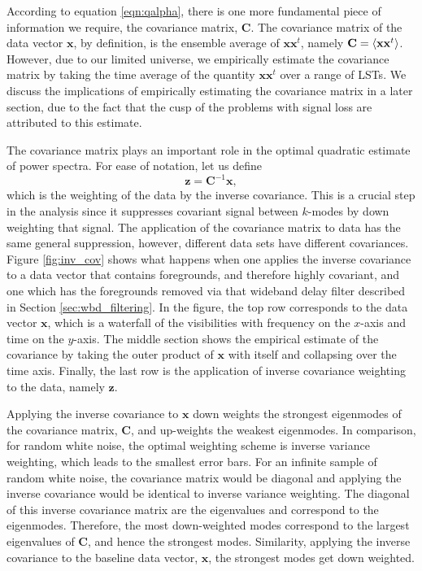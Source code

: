 \documentclass[twocolumn,numberedappendix]{emulateapj} \shorttitle{PSA64}
\newcommand{\x}{\mathbf{x}} \newcommand{\xhat}{\hat{\mathbf{x}}}
\newcommand{\C}{\mathbf{C}} \newcommand{\Q}{\mathbf{Q}}
\begin{document}
According to equation \ref{eqn:qalpha}, there is one more fundamental piece of
information we require, the covariance matrix, $\mathbf{C}$. The covariance
matrix of the data vector $\x$, by definition, is the ensemble average of
$\x\x^{t}$, namely $\mathbf{C} = \expval{\x\x^{t}}$. However, due to our limited
universe, we empirically estimate the covariance matrix by taking the time average of the
quantity $\x\x^{t}$ over a range of LSTs. We discuss the implications of
empirically estimating the covariance matrix in a later section, due to the fact
that the cusp of the problems with signal loss are attributed to this estimate.

The covariance matrix plays an important role in the optimal quadratic estimate
of power spectra. For ease of notation, let us define 
\begin{equation}\label{eqn:z}
    \mathbf{z} =  \mathbf{C}^{-1}\mathbf{x},
\end{equation}
which is the weighting of the data by the inverse covariance. This is a crucial
step in the analysis since it suppresses covariant signal between $k$-modes by
down weighting that signal. The application of the covariance matrix to data has
the same general suppression, however, different data sets have different
covariances. Figure  \ref{fig:inv_cov} shows what happens when one applies the
inverse covariance to a data vector that contains foregrounds, and therefore
highly covariant,  and one which has the foregrounds removed via that wideband
delay filter described in Section \ref{sec:wbd_filtering}.  In the figure, the
top row corresponds to the data vector $\mathbf{x}$, which is a waterfall of
the visibilities with frequency on the $x$-axis and time on the $y$-axis. The
middle section shows the empirical estimate of the covariance by taking the
outer product of $\x$ with itself and collapsing over the time axis. Finally,
the last row is the application of inverse covariance weighting to the data,
namely $\mathbf{z}$.

Applying the inverse covariance to $\x$ down weights the
strongest eigenmodes of the covariance matrix, $\mathbf{C}$, and up-weights the
weakest eigenmodes. In comparison, for random white noise, the optimal
weighting scheme is inverse variance weighting, which leads to the smallest
error bars. For an infinite sample of random white noise, the covariance matrix
would be diagonal and applying the inverse covariance would be identical to
inverse variance weighting. The diagonal of this inverse covariance matrix are
the eigenvalues and correspond to the eigenmodes. Therefore, the most
down-weighted modes correspond to the largest eigenvalues of $\C$, and hence the
strongest modes.  Similarity, applying the inverse covariance to the baseline
data vector, $\x$, the strongest modes get down weighted. 
\end{document}
